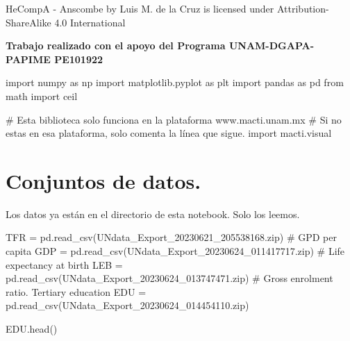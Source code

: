 \documentclass[
  letterpaper,
  DIV=11,
  numbers=noendperiod]{scrreprt}
\newenvironment{Shaded}{\begin{snugshade}}{\end{snugshade}}
\newcommand{\CommentTok}[1]{\textcolor[rgb]{0.37,0.37,0.37}{#1}}
\newcommand{\ImportTok}[1]{\textcolor[rgb]{0.00,0.46,0.62}{#1}}
\newcommand{\NormalTok}[1]{\textcolor[rgb]{0.00,0.23,0.31}{#1}}
\newcommand{\OperatorTok}[1]{\textcolor[rgb]{0.37,0.37,0.37}{#1}}
\newcommand{\StringTok}[1]{\textcolor[rgb]{0.13,0.47,0.30}{#1}}
\begin{document}
HeCompA - Anscombe by Luis M. de la Cruz is licensed under
Attribution-ShareAlike 4.0 International

\textbf{Trabajo realizado con el apoyo del Programa UNAM-DGAPA-PAPIME
PE101922}

\begin{Shaded}
\begin{Highlighting}[]
\ImportTok{import}\NormalTok{ numpy }\ImportTok{as}\NormalTok{ np}
\ImportTok{import}\NormalTok{ matplotlib.pyplot }\ImportTok{as}\NormalTok{ plt}
\ImportTok{import}\NormalTok{ pandas }\ImportTok{as}\NormalTok{ pd }
\ImportTok{from}\NormalTok{ math }\ImportTok{import}\NormalTok{ ceil}

\CommentTok{\# Esta biblioteca solo funciona en la plataforma www.macti.unam.mx}
\CommentTok{\# Si no estas en esa plataforma, solo comenta la línea que sigue.}
\ImportTok{import}\NormalTok{ macti.visual}
\end{Highlighting}
\end{Shaded}


\chapter{Conjuntos de datos.}\label{conjuntos-de-datos.}

Los datos ya están en el directorio de esta notebook. Solo los leemos.

\begin{Shaded}
\begin{Highlighting}[]
\NormalTok{TFR }\OperatorTok{=}\NormalTok{ pd.read\_csv(}\StringTok{\textquotesingle{}UNdata\_Export\_20230621\_205538168.zip\textquotesingle{}}\NormalTok{)}
\CommentTok{\# GPD per capita}
\NormalTok{GDP }\OperatorTok{=}\NormalTok{ pd.read\_csv(}\StringTok{\textquotesingle{}UNdata\_Export\_20230624\_011417717.zip\textquotesingle{}}\NormalTok{)}
\CommentTok{\# Life expectancy at birth }
\NormalTok{LEB }\OperatorTok{=}\NormalTok{ pd.read\_csv(}\StringTok{\textquotesingle{}UNdata\_Export\_20230624\_013747471.zip\textquotesingle{}}\NormalTok{)}
\CommentTok{\# Gross enrolment ratio. Tertiary education}
\NormalTok{EDU }\OperatorTok{=}\NormalTok{ pd.read\_csv(}\StringTok{\textquotesingle{}UNdata\_Export\_20230624\_014454110.zip\textquotesingle{}}\NormalTok{)}
\end{Highlighting}
\end{Shaded}

\begin{Shaded}
\begin{Highlighting}[]
\NormalTok{EDU.head()}
\end{Highlighting}
\end{Shaded}
\end{document}
